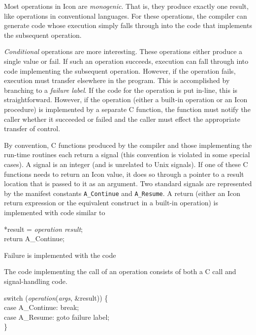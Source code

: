 Most operations in Icon are \textit{monogenic}. That is, they produce
exactly one result, like operations in conventional languages. For
these operations, the compiler can generate code whose execution
simply falls through into the code that implements the subsequent
operation.

\textit{Conditional} operations are more interesting. These operations
either produce a single value or fail. If such an operation succeeds,
execution can fall through into code implementing the subsequent
operation. However, if the operation fails, execution must transfer
elsewhere in the program. This is accomplished by branching to a
\textit{failure label}. If the code for the operation is put in-line,
this is straightforward. However, if the operation (either a built-in
operation or an Icon procedure) is implemented by a separate C
function, the function must notify the caller whether it succeeded or
failed and the caller must effect the appropriate transfer of control.

By convention, C functions produced by the compiler and those
implementing the run-time routines each return a signal (this
convention is violated in some special cases). A signal is an integer
(and is unrelated to Unix signals). If one of these C functions needs
to return an Icon value, it does so through a pointer to a result
location that is passed to it as an argument. Two standard signals are
represented by the manifest constants \texttt{A\_Continue} and
\texttt{A\_Resume}. A return (either an Icon return expression or
the equivalent construct in a built-in operation) is implemented with
code similar to

\goodbreak
\begin{iconcode}
*result = \textit{operation result};\\
return A\_Continue;\\
\end{iconcode}

\noindent Failure is implemented with the code 



\noindent The code implementing the call of an operation consists of
both a C call and signal-handling code.

\goodbreak
\begin{iconcode}
switch (\textit{operation}(\textit{args}, \&result)) \{\\
\>case A\_Continue: break;\\
\>case A\_Resume: goto failure label;\\
\}\\
\end{iconcode}


